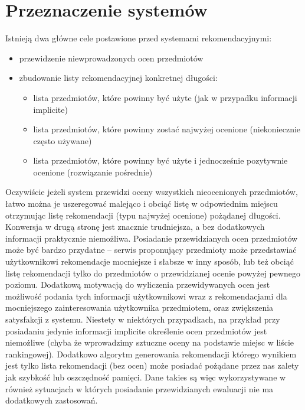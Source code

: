 \documentclass{pracamgr}
\begin{document}
  \section{Przeznaczenie systemów}
   Istnieją dwa główne cele postawione przed systemami rekomendacyjnymi:
   \begin{itemize}\itemsep1pt \parskip0pt 
    \item przewidzenie niewprowadzonych ocen przedmiotów   
    \item zbudowanie listy rekomendacyjnej konkretnej długości:
      \begin{itemize}\itemsep1pt \parskip0pt 
	\item lista przedmiotów, które powinny być użyte (jak w przypadku informacji implicite)
	\item lista przedmiotów, które powinny zostać najwyżej ocenione (niekoniecznie często używane)
	\item lista przedmiotów, które powinny być użyte i jednocześnie pozytywnie ocenione (rozwiązanie pośrednie)
      \end{itemize}
   \end{itemize}
   Oczywiście jeżeli system przewidzi oceny wszystkich nieocenionych przedmiotów,
   łatwo można je uszeregować malejąco i obciąć listę w odpowiednim miejscu otrzymując listę rekomendacji (typu najwyżej ocenione) pożądanej długości.\newline
   Konwersja w drugą stronę jest znacznie trudniejsza, a bez dodatkowych informacji praktycznie niemożliwa.\newline
   Posiadanie przewidzianych ocen przedmiotów może być bardzo przydatne -- serwis proponujący przedmioty może przedstawiać użytkownikowi
   rekomendacje mocniejsze i słabsze w inny sposób, lub też obciąć listę rekomendacji tylko do przedmiotów o przewidzianej ocenie powyżej pewnego poziomu.
   Dodatkową motywacją do wyliczenia przewidywanych ocen jest możliwość podania tych informacji użytkownikowi wraz z rekomendacjami
   dla mocniejszego zainteresowania użytkownika przedmiotem, oraz zwiększenia satysfakcji z systemu.\newline
   Niestety w niektórych przypadkach, na przykład przy posiadaniu jedynie informacji implicite określenie ocen przedmiotów jest niemożliwe
   (chyba że wprowadzimy sztuczne oceny na podstawie miejsc w liście rankingowej). Dodatkowo algorytm generowania rekomendacji którego wynikiem
   jest tylko lista rekomendacji (bez ocen) może posiadać pożądane przez nas zalety jak szybkość lub oszczędność pamięci.
   Dane takies są więc wykorzystywane w również sytuacjach w których posiadanie przewidzianych ewaluacji nie ma dodatkowych zastosowań.
   
\end{document}
